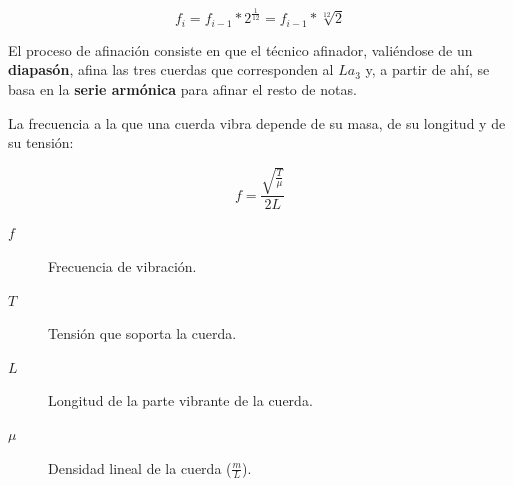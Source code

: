 \documentclass[10pt,a4paper]{article}
\begin{document}
	\begin{equation}
		f_i = f_{i-1} * 2^{\frac{1}{12}} = f_{i-1} * \sqrt[12]{2}
	\end{equation}
	
	El proceso de afinación consiste en que el técnico afinador, valiéndose de 
	un \textbf{diapasón}, afina las tres cuerdas que corresponden al $La_3$ y, 
	a partir de ahí, se basa en la \textbf{serie armónica} para afinar el resto 
	de notas.
	
	La frecuencia a la que una cuerda vibra depende de su masa, de su longitud 
	y de su tensión:
	
	\begin{equation}
		f = \frac{\sqrt{\frac{T}{\mu}}}{2L}
	\end{equation}
	
	\begin{description}
		\item[$f$] Frecuencia de vibración.
		\item[$T$] Tensión que soporta la cuerda.
		\item[$L$] Longitud de la parte vibrante de la cuerda.
		\item[$\mu$] Densidad lineal de la cuerda ($\frac{m}{L}$).
	\end{description}
\end{document}
